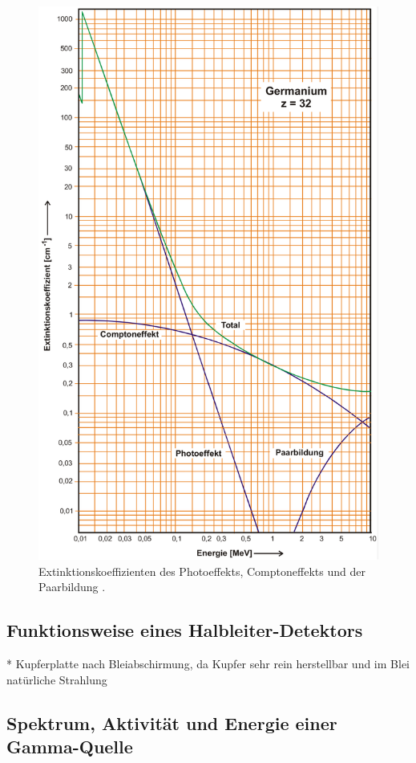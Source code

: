 \begin{figure}
	\centering
	\includegraphics[width=.9\textwidth]{images/Wirkungsquerschnitte-gesamt.pdf}
	\caption{Extinktionskoeffizienten des Photoeffekts, Comptoneffekts und der Paarbildung \cite[9]{anleitung}.}
	\label{fig:Wirkungsquerschnitte-gesamt}
\end{figure}

\subsection{Funktionsweise eines Halbleiter-Detektors}
\label{sec:HLDetektor}

* Kupferplatte nach Bleiabschirmung, da Kupfer sehr rein herstellbar und im Blei natürliche Strahlung

\subsection{Spektrum, Aktivität und Energie einer Gamma-Quelle}
\label{sec:TypischeQuelle}

